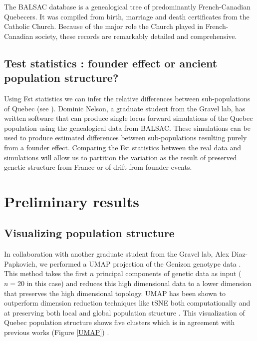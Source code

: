 \documentclass[
11pt, %
oneside, %
english, %
doublespacing, %
headsepline, %
chapterinoneline, %
]{MastersDoctoralThesis} %
\begin{document}
The BALSAC database is a genealogical tree of predominantly French-Canadian Quebecers.
It was compiled from birth, marriage and death certificates from the Catholic Church.
Because of the major role the Church played in French-Canadian society, these records are remarkably detailed and comprehensive.

\subsection{Test statistics : founder effect or ancient population structure?}
Using Fst statistics we can infer the relative differences between sub-populations of Quebec (see \citep{Roy-Gagnon2011}).
Dominic Nelson, a graduate student from the Gravel lab, has written software that can produce single locus forward simulations of the Quebec population using the genealogical data from BALSAC.
These simulations can be used to produce estimated differences between sub-populations resulting purely from a founder effect.
Comparing the Fst statistics between the real data and simulations will allow us to partition the variation as the result of preserved genetic structure from France or of drift from founder events.

\section{Preliminary results}

\subsection{Visualizing population structure}
In collaboration with another graduate student from the Gravel lab, Alex Diaz-Papkovich, we performed a UMAP projection of the Genizon genotype data \citep{mcinnes2018umap,diaz2018}.
This method takes the first $n$ principal components of genetic data as input ($n = 20$ in this case) and reduces this high dimensional data to a lower dimension that preserves the high dimensional topology.
UMAP has been shown to outperform dimension reduction techniques like tSNE both computationally and at preserving both local and global population structure \citep{diaz2018, mcinnes2018umap}.
This visualization of Quebec population structure shows five clusters which is in agreement with previous works (Figure \ref{UMAP}) \citep{Gagnon2001, Bherer2011,Roy-Gagnon2011}. 
\vfill
\end{document}
